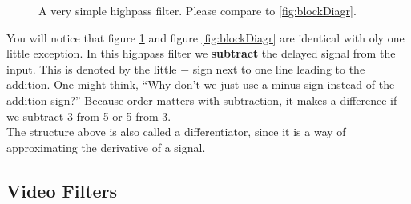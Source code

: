 \begin{figure}[H]
  \centering  
  \label{fig:string}
  \caption{A very simple highpass filter. Please compare to \ref{fig:blockDiagr}. }
  \label{fig:blockDiagrHigh}
\end{figure}

You will notice that figure \ref{fig:blockDiagrHigh} and figure \ref{fig:blockDiagr} are identical with oly one little exception. In this highpass filter we \textbf{subtract} the delayed signal from the input. This is denoted by the little $-$ sign next to one line leading to the addition. One might think, ``Why don't we just use a minus sign instead of the addition sign?'' Because order matters with subtraction, it makes a difference if we subtract 3 from 5 or 5 from 3.\\
The structure above is also called a differentiator, since it is a way of approximating the derivative of a signal.





\subsection{Video Filters}


